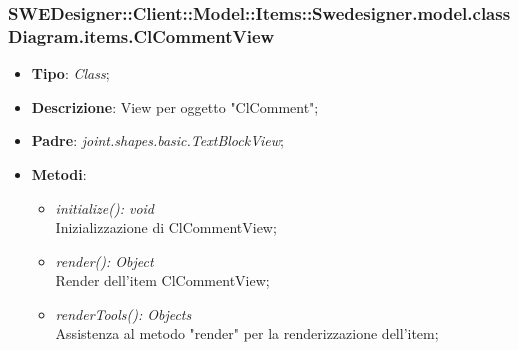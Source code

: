 \documentclass[../DefinizioneDiProdotto.tex]{subfiles}
\begin{document}
			\subsubsection{SWEDesigner::Client::Model::Items::Swedesigner.model.classDiagram.items.ClCommentView}
			\hypertarget{SWEDesigner::Client::Model::Items::Swedesigner.model.classDiagram.items.ClCommentView}{}
			\begin{itemize}
				\item \textbf{Tipo}: \emph{Class};
				\item \textbf{Descrizione}: View per oggetto "ClComment";
				\item \textbf{Padre}: \emph{joint.shapes.basic.TextBlockView};
				\item \textbf{Metodi}:
				\begin{itemize}
					\item \emph{initialize(): void}\\
					Inizializzazione di ClCommentView;
					\item \emph{render(): Object}\\
					Render dell'item ClCommentView;
					\item \emph{renderTools(): Objects}\\
					Assistenza al metodo "render" per la renderizzazione dell'item;
				\end{itemize}
			\end{itemize}
			
\end{document}
